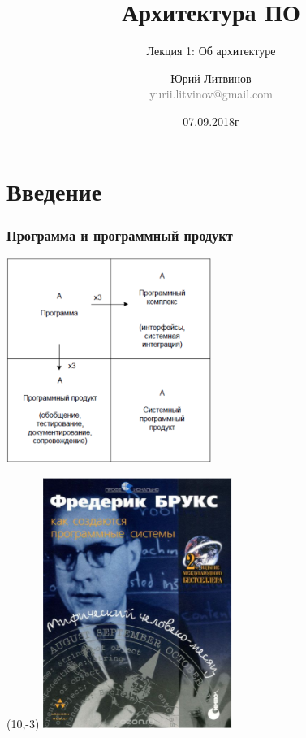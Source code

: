 \documentclass[xetex,mathserif,serif]{beamer}
\title{Архитектура ПО}
\subtitle{Лекция 1: Об архитектуре}
\author[Юрий Литвинов]{Юрий Литвинов\\\small{\textcolor{gray}{yurii.litvinov@gmail.com}}}
\date{07.09.2018г}
\begin{document}
	\frame{\titlepage}

	\section{Введение}

	\begin{frame}
		\frametitle{Программа и программный продукт}
		\begin{center}
			\includegraphics[width=0.5\textwidth]{brooksSquare.png}
		\end{center}
		\begin{textblock}{2}(10,-3)
			\includegraphics[width=\textwidth]{brooksCover.png}
		\end{textblock}
	\end{frame}
\end{document}

